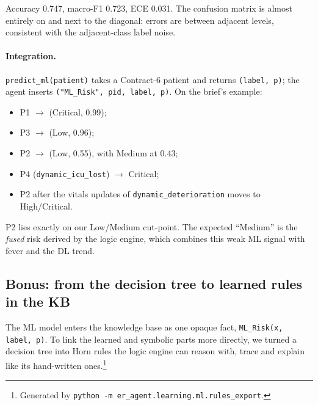 \noindent Accuracy 0.747, macro-F1 0.723, ECE 0.031. The confusion matrix is almost entirely on and next to
the diagonal: errors are between adjacent levels, consistent with the adjacent-class label noise.

\paragraph{Integration.}
\texttt{predict\_ml(patient)} takes a Contract-6 patient and returns \texttt{(label, p)}; the agent inserts
\texttt{("ML\_Risk", pid, label, p)}. On the brief's example:
\begin{itemize}
  \item P1 $\to$ (Critical, 0.99);
  \item P3 $\to$ (Low, 0.96);
  \item P2 $\to$ (Low, 0.55), with Medium at 0.43;
  \item P4 (\texttt{dynamic\_icu\_lost}) $\to$ Critical;
  \item P2 after the vitals updates of \texttt{dynamic\_deterioration} moves to High/Critical.
\end{itemize}
P2 lies exactly on our Low/Medium cut-point. The expected ``Medium'' is the \emph{fused} risk derived by the
logic engine, which combines this weak ML signal with fever and the DL trend.

\subsection{Bonus: from the decision tree to learned rules in the KB}

The ML model enters the knowledge base as one opaque fact, \texttt{ML\_Risk(x, label, p)}. To link the learned
and symbolic parts more directly, we turned a decision tree into Horn rules the logic engine can reason with,
trace and explain like its hand-written ones.\footnote{Generated by
\texttt{python -m er\_agent.learning.ml.rules\_export}.}

